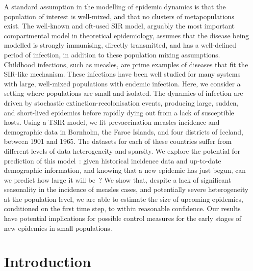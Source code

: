 \documentclass[10pt]{article}
\begin{document}
A standard assumption in the modelling of epidemic dynamics is that the population of interest is well-mixed, and that no clusters of metapopulations exist. The well-known and oft-used SIR model, arguably the most important compartmental model in theoretical epidemiology, assumes that the disease being modelled is strongly immunising, directly transmitted, and has a well-defined period of infection, in addition to these population mixing assumptions. Childhood infections, such as measles, are prime examples of diseases that fit the SIR-like mechanism. These infections have been well studied for many systems with large, well-mixed populations with endemic infection. Here, we consider a setting where populations are small and isolated. The dynamics of infection are driven by stochastic extinction-recolonisation events, producing large, sudden, and short-lived epidemics before rapidly dying out from a lack of susceptible hosts. Using a TSIR model, we fit prevaccination measles incidence and demographic data in Bornholm, the Faroe Islands, and four districts of Iceland, between 1901 and 1965. The datasets for each of these countries suffer from different levels of data heterogeneity and sparsity. We explore the potential for prediction of this model~: given historical incidence data and up-to-date demographic information, and knowing that a new epidemic has just begun, can we predict how large it will be~? We show that, despite a lack of significant seasonality in the incidence of measles cases, and potentially severe heterogeneity at the population level, we are able to estimate the size of upcoming epidemics, conditioned on the first time step, to within reasonable confidence. Our results have potential implications for possible control measures for the early stages of new epidemics in small populations.













\section*{Introduction}
\end{document}

